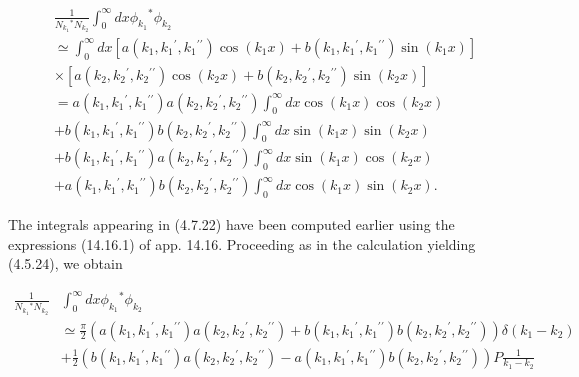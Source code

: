 \documentclass{article}
\begin{document}
\begin{align*}
& \frac{1}{N_{k_{1}}{ }^{*} N_{k_{2}}} \int_{0}^{\infty} d x \phi_{k_{1}}{ }^{*} \phi_{k_{2}}  \tag{4.7.22}\\
& \simeq \int_{0}^{\infty} d x\left[a\left(k_{1}, k_{1}{ }^{\prime}, k_{1}{ }^{\prime \prime}\right) \cos \left(k_{1} x\right)+b\left(k_{1}, k_{1}{ }^{\prime}, k_{1}{ }^{\prime \prime}\right) \sin \left(k_{1} x\right)\right] \\
& \times\left[a\left(k_{2}, k_{2}{ }^{\prime}, k_{2}{ }^{\prime \prime}\right) \cos \left(k_{2} x\right)+b\left(k_{2}, k_{2}{ }^{\prime}, k_{2}{ }^{\prime \prime}\right) \sin \left(k_{2} x\right)\right] \\
& =a\left(k_{1}, k_{1}{ }^{\prime}, k_{1}{ }^{\prime \prime}\right) a\left(k_{2}, k_{2}{ }^{\prime}, k_{2}{ }^{\prime \prime}\right) \int_{0}^{\infty} d x \cos \left(k_{1} x\right) \cos \left(k_{2} x\right) \\
& +b\left(k_{1}, k_{1}{ }^{\prime}, k_{1}{ }^{\prime \prime}\right) b\left(k_{2}, k_{2}{ }^{\prime}, k_{2}{ }^{\prime \prime}\right) \int_{0}^{\infty} d x \sin \left(k_{1} x\right) \sin \left(k_{2} x\right) \\
& +b\left(k_{1}, k_{1}{ }^{\prime}, k_{1}{ }^{\prime \prime}\right) a\left(k_{2}, k_{2}{ }^{\prime}, k_{2}{ }^{\prime \prime}\right) \int_{0}^{\infty} d x \sin \left(k_{1} x\right) \cos \left(k_{2} x\right) \\
& +a\left(k_{1}, k_{1}{ }^{\prime}, k_{1}{ }^{\prime \prime}\right) b\left(k_{2}, k_{2}{ }^{\prime}, k_{2}{ }^{\prime \prime}\right) \int_{0}^{\infty} d x \cos \left(k_{1} x\right) \sin \left(k_{2} x\right) .
\end{align*}
 

The integrals appearing in (4.7.22) have been computed earlier using the expressions (14.16.1) of app. 14.16. Proceeding as in the calculation yielding (4.5.24), we obtain
 
\begin{align*}
\frac{1}{N_{k_{1}}{ }^{*} N_{k_{2}}} & \int_{0}^{\infty} d x \phi_{k_{1}}{ }^{*} \phi_{k_{2}}  \tag{4.7.23}\\
& \simeq \frac{\pi}{2}\left(a\left(k_{1}, k_{1}{ }^{\prime}, k_{1}{ }^{\prime \prime}\right) a\left(k_{2}, k_{2}{ }^{\prime}, k_{2}{ }^{\prime \prime}\right)+b\left(k_{1}, k_{1}{ }^{\prime}, k_{1}{ }^{\prime \prime}\right) b\left(k_{2}, k_{2}{ }^{\prime}, k_{2}{ }^{\prime \prime}\right)\right) \delta\left(k_{1}-k_{2}\right) \\
& +\frac{1}{2}\left(b\left(k_{1}, k_{1}{ }^{\prime}, k_{1}{ }^{\prime \prime}\right) a\left(k_{2}, k_{2}{ }^{\prime}, k_{2}{ }^{\prime \prime}\right)-a\left(k_{1}, k_{1}{ }^{\prime}, k_{1}{ }^{\prime \prime}\right) b\left(k_{2}, k_{2}{ }^{\prime}, k_{2}{ }^{\prime \prime}\right)\right) P \frac{1}{k_{1}-k_{2}}
\end{align*}
 
\end{document}

